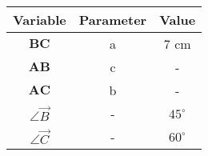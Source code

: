 \begin{center}
    \begin{tabular}{|c|c|c|} 
        \hline
            \textbf{Variable} & \textbf{Parameter} & \textbf{Value} \\ 
        \hline
            $\boldsymbol{BC}$ & a & 7 cm \\ 
        \hline
            $\boldsymbol{AB}$ & c & - \\ 
        \hline
            $\boldsymbol{AC}$ & b &   -    \\
        \hline
            $\angle \vec{B}$  & -  & $45^\circ$ \\
        \hline
	    $\angle \vec{C}$ & - & $60^\circ$ \\
	\hline 
    \end{tabular}
\end{center}  



